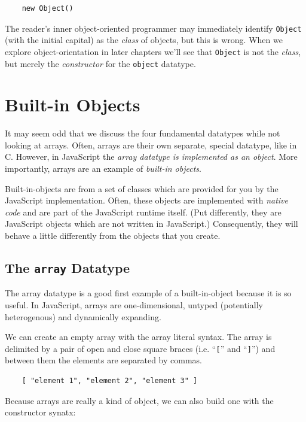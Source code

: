 \documentclass[11pt,letter]{book}
\begin{document}
    \begin{verbatim}
    new Object()
    \end{verbatim}
    
    The reader's inner object-oriented programmer may immediately identify \texttt{Object} (with the 
    initial capital) as the \emph{class} of objects, but this is wrong. When we explore 
    object-orientation in later chapters we'll see that \texttt{Object} is not the \emph{class}, but 
    merely the \emph{constructor} for the \texttt{object} datatype.
    
    \section{Built-in Objects}
    It may seem odd that we discuss the four fundamental datatypes while not looking at arrays.
    Often, arrays are their own separate, special datatype, like in C. However, in JavaScript the 
    \emph{array datatype is implemented as an object}. More importantly, arrays are an example of 
    \emph{built-in objects}.
    
    Built-in-objects are from a set of classes which are provided for you by the JavaScript 
    implementation. Often, these objects are implemented with \emph{native code} and are part of 
    the JavaScript runtime itself. (Put differently, they are JavaScript objects which are not 
    written in JavaScript.) Consequently, they will behave a little differently from the objects 
    that you create.
    
    \subsection{The \texttt{array} Datatype}
    
    The array datatype is a good first example of a built-in-object because it is so useful. In 
    JavaScript, arrays are one-dimensional, untyped (potentially heterogenous) and dynamically 
    expanding. 
    
    We can create an empty array with the array literal syntax. The array is delimited by a pair of 
    open and close square braces (i.e. ``\texttt{[}'' and ``\texttt{]}'') and between them the 
    elements are separated by commas.
    
    \begin{verbatim}
    [ "element 1", "element 2", "element 3" ]
    \end{verbatim}
    
    Because arrays are really a kind of object, we can also build one with the constructor synatx:
    
\end{document}
